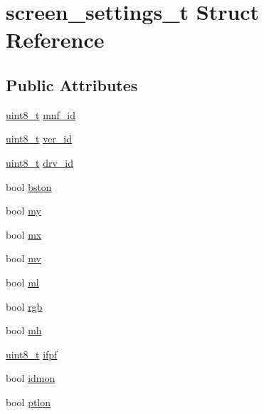 \hypertarget{structscreen__settings__t}{}\section{screen\+\_\+settings\+\_\+t Struct Reference}
\label{structscreen__settings__t}
\subsection*{Public Attributes}
\begin{DoxyCompactItemize}
\item 
\hyperlink{vl53l0x__types_8h_aba7bc1797add20fe3efdf37ced1182c5}{uint8\+\_\+t} \hyperlink{structscreen__settings__t_a06d597efab1bc13bc657b4ea6dae4592}{mnf\+\_\+id}
\item 
\hyperlink{vl53l0x__types_8h_aba7bc1797add20fe3efdf37ced1182c5}{uint8\+\_\+t} \hyperlink{structscreen__settings__t_a05dc3e5a9e54fdf1173dd3c9b9fbc6f4}{ver\+\_\+id}
\item 
\hyperlink{vl53l0x__types_8h_aba7bc1797add20fe3efdf37ced1182c5}{uint8\+\_\+t} \hyperlink{structscreen__settings__t_a0b6a0e2a0df6813023c86e9354a4f185}{drv\+\_\+id}
\item 
bool \hyperlink{structscreen__settings__t_aac406fcdf039a835479da26647ecf6bd}{bston}
\item 
bool \hyperlink{structscreen__settings__t_a0fb5e9d5dbc528c86d736fe19a52b843}{my}
\item 
bool \hyperlink{structscreen__settings__t_a93270669bbb6354b04cb443d569ecf28}{mx}
\item 
bool \hyperlink{structscreen__settings__t_a15540f28894b9a28bd19bbac7bf68783}{mv}
\item 
bool \hyperlink{structscreen__settings__t_adb95ada049cc88b286d64c5cee67e82b}{ml}
\item 
bool \hyperlink{structscreen__settings__t_a20c4b773bc0965d0ce9a1aa4286f1904}{rgb}
\item 
bool \hyperlink{structscreen__settings__t_a91e2e317da6bbe919f01cc9992622c9c}{mh}
\item 
\hyperlink{vl53l0x__types_8h_aba7bc1797add20fe3efdf37ced1182c5}{uint8\+\_\+t} \hyperlink{structscreen__settings__t_a40885e4438ae3b750c667132c5d5f258}{ifpf}
\item 
bool \hyperlink{structscreen__settings__t_aca5674cfa96ae81895c44eda562ba1de}{idmon}
\item 
bool \hyperlink{structscreen__settings__t_ae7cf1d9d23331e98009318749852f4a2}{ptlon}

\end{DoxyCompactItemize}
